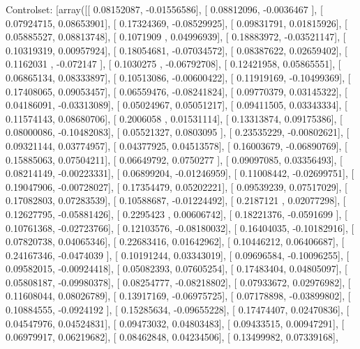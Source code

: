 \documentclass{article}
\begin{document}
Controlset: [array([[ 0.08152087, -0.01556586],
       [ 0.08812096, -0.0036467 ],
       [ 0.07924715,  0.08653901],
       [ 0.17324369, -0.08529925],
       [ 0.09831791,  0.01815926],
       [ 0.05885527,  0.08813748],
       [ 0.1071909 ,  0.04996939],
       [ 0.18883972, -0.03521147],
       [ 0.10319319,  0.00957924],
       [ 0.18054681, -0.07034572],
       [ 0.08387622,  0.02659402],
       [ 0.1162031 , -0.072147  ],
       [ 0.1030275 , -0.06792708],
       [ 0.12421958,  0.05865551],
       [ 0.06865134,  0.08333897],
       [ 0.10513086, -0.00600422],
       [ 0.11919169, -0.10499369],
       [ 0.17408065,  0.09053457],
       [ 0.06559476, -0.08241824],
       [ 0.09770379,  0.03145322],
       [ 0.04186091, -0.03313089],
       [ 0.05024967,  0.05051217],
       [ 0.09411505,  0.03343334],
       [ 0.11574143,  0.08680706],
       [ 0.2006058 ,  0.01531114],
       [ 0.13313874,  0.09175386],
       [ 0.08000086, -0.10482083],
       [ 0.05521327,  0.0803095 ],
       [ 0.23535229, -0.00802621],
       [ 0.09321144,  0.03774957],
       [ 0.04377925,  0.04513578],
       [ 0.16003679, -0.06890769],
       [ 0.15885063,  0.07504211],
       [ 0.06649792,  0.0750277 ],
       [ 0.09097085,  0.03356493],
       [ 0.08214149, -0.00223331],
       [ 0.06899204, -0.01246959],
       [ 0.11008442, -0.02699751],
       [ 0.19047906, -0.00728027],
       [ 0.17354479,  0.05202221],
       [ 0.09539239,  0.07517029],
       [ 0.17082803,  0.07283539],
       [ 0.10588687, -0.01224492],
       [ 0.2187121 ,  0.02077298],
       [ 0.12627795, -0.05881426],
       [ 0.2295423 ,  0.00606742],
       [ 0.18221376, -0.0591699 ],
       [ 0.10761368, -0.02723766],
       [ 0.12103576, -0.08180032],
       [ 0.16404035, -0.10182916],
       [ 0.07820738,  0.04065346],
       [ 0.22683416,  0.01642962],
       [ 0.10446212,  0.06406687],
       [ 0.24167346, -0.0474039 ],
       [ 0.10191244,  0.03343019],
       [ 0.09696584, -0.10096255],
       [ 0.09582015, -0.00924418],
       [ 0.05082393,  0.07605254],
       [ 0.17483404,  0.04805097],
       [ 0.05808187, -0.09980378],
       [ 0.08254777, -0.08218802],
       [ 0.07933672,  0.02976982],
       [ 0.11608044,  0.08026789],
       [ 0.13917169, -0.06975725],
       [ 0.07178898, -0.03899802],
       [ 0.10884555, -0.0924192 ],
       [ 0.15285634, -0.09655228],
       [ 0.17474407,  0.02470836],
       [ 0.04547976,  0.04524831],
       [ 0.09473032,  0.04803483],
       [ 0.09433515,  0.00947291],
       [ 0.06979917,  0.06219682],
       [ 0.08462848,  0.04234506],
       [ 0.13499982,  0.07339168],
\end{document}
